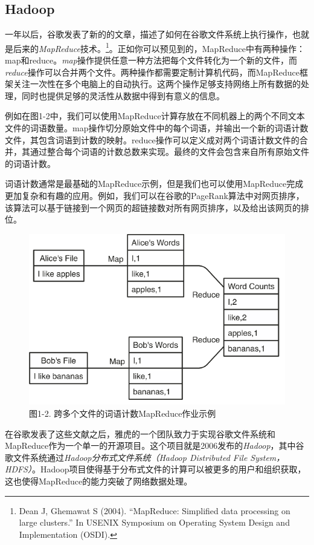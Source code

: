 \documentclass[
]{article}
\begin{document}
\hypertarget{hadoop}{%
\subsection{Hadoop}\label{hadoop}}

一年以后，谷歌发表了新的的文章，描述了如何在谷歌文件系统上执行操作，也就是后来的\emph{MapReduce}技术。\footnote{Dean
  J, Ghemawat S (2004). ``MapReduce: Simplified data processing on large
  clusters.'' In USENIX Symposium on Operating System Design and
  Implementation (OSDI).}。正如你可以预见到的，MapReduce中有两种操作：map和reduce。\emph{map}操作提供任意一种方法把每个文件转化为一个新的文件，而\emph{reduce}操作可以合并两个文件。两种操作都需要定制计算机代码，而MapReduce框架关注一次性在多个电脑上的自动执行。这两个操作足够支持网络上所有数据的处理，同时也提供足够的灵活性从数据中得到有意义的信息。

例如在图1-2中，我们可以使用MapReduce计算存放在不同机器上的两个不同文本文件的词语数量。map操作切分原始文件中的每个词语，并输出一个新的词语计数文件，其包含词语到计数的映射。reduce操作可以定义成对两个词语计数文件的合并，其通过整合每个词语的计数总数来实现。最终的文件会包含来自所有原始文件的词语计数。

词语计数通常是最基础的MapReduce示例，但是我们也可以使用MapReduce完成更加复杂和有趣的应用。例如，我们可以在谷歌的PageRank算法中对网页排序，该算法可以基于链接到一个网页的超链接数对所有网页排序，以及给出该网页的排位。

\begin{figure}
\centering
\includegraphics{figures/1_2.png}
\caption{图1-2. 跨多个文件的词语计数MapReduce作业示例}
\end{figure}

在谷歌发表了这些文献之后，雅虎的一个团队致力于实现谷歌文件系统和MapReduce作为一个单一的开源项目。这个项目就是2006发布的\emph{Hadoop}，其中谷歌文件系统通过\emph{Hadoop分布式文件系统（Hadoop
Distributed File
System，HDFS）}。Hadoop项目使得基于分布式文件的计算可以被更多的用户和组织获取，这也使得MapReduce的能力突破了网络数据处理。
\end{document}
